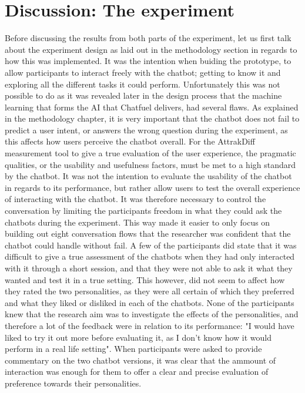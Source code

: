 \section{Discussion: The experiment}
Before discussing the results from both parts of the experiment, let us first talk about the experiment design as laid out in the methodology section in regards to how this was implemented. It was the intention when buiding the prototype, to allow participants to interact freely with the chatbot; getting to know it and exploring all the different tasks it could perform. Unfortunately this was not possible to do as it was revealed later in the design process that the machine learning that forms the AI that Chatfuel delivers, had several flaws. As explained in the methodology chapter, it is very important that the chatbot does not fail to predict a user intent, or answers the wrong question during the experiment, as this affects how users perceive the chatbot overall. For the AttrakDiff measurement tool to give a true evaluation of the user experience, the pragmatic qualities, or the usability and usefulness factors, must be met to a high standard by the chatbot. It was not the intention to evaluate the usability of the chatbot in regards to its performance, but rather allow users to test the overall experience of interacting with the chatbot. It was therefore necessary to control the conversation by limiting the participants freedom in what they could ask the chatbots during the experiment. This way made it easier to only focus on building out eight conversation flows that the researcher was confident that the chatbot could handle without fail. A few of the participants did state that it was difficult to give a true assessment of the chatbots when they had only interacted with it through a short session, and that they were not able to ask it what they wanted and test it in a true setting. This however, did not seem to affect how they rated the two personalities, as they were all certain of which they preferred and what they liked or disliked in each of the chatbots. None of the participants knew that the research aim was to investigate the effects of the personalities, and therefore a lot of the feedback were in relation to its performance: "I would have liked to try it out more before evaluating it, as I don't know how it would perform in a real life setting". When participants were asked to provide commentary on the two chatbot versions, it was clear that the ammount of interaction was enough for them to offer a clear and precise evaluation of preference towards their personalities. 


